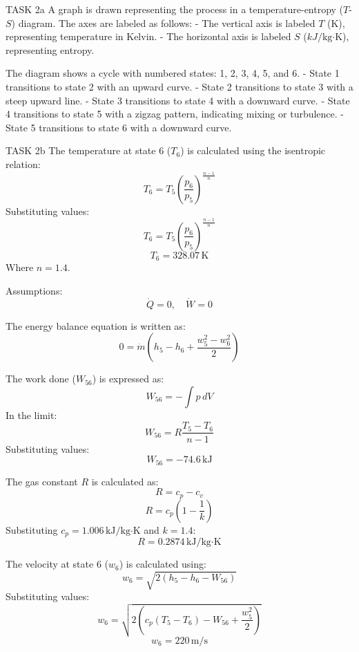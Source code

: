 TASK 2a  
A graph is drawn representing the process in a temperature-entropy (\(T\)-\(S\)) diagram. The axes are labeled as follows:  
- The vertical axis is labeled \(T\) (K), representing temperature in Kelvin.  
- The horizontal axis is labeled \(S\) (\(kJ/\text{kg·K}\)), representing entropy.  

The diagram shows a cycle with numbered states: 1, 2, 3, 4, 5, and 6.  
- State 1 transitions to state 2 with an upward curve.  
- State 2 transitions to state 3 with a steep upward line.  
- State 3 transitions to state 4 with a downward curve.  
- State 4 transitions to state 5 with a zigzag pattern, indicating mixing or turbulence.  
- State 5 transitions to state 6 with a downward curve.  

TASK 2b  
The temperature at state 6 (\(T_6\)) is calculated using the isentropic relation:  
\[
T_6 = T_5 \left( \frac{p_6}{p_5} \right)^{\frac{n-1}{n}}
\]  
Substituting values:  
\[
T_6 = T_5 \left( \frac{p_6}{p_5} \right)^{\frac{n-1}{n}}
\]  
\[
T_6 = 328.07 \, \text{K}
\]  
Where \(n = 1.4\).  

Assumptions:  
\[
\dot{Q} = 0, \quad \dot{W} = 0
\]  

The energy balance equation is written as:  
\[
0 = \dot{m} \left( h_5 - h_6 + \frac{w_5^2 - w_6^2}{2} \right)
\]  

The work done (\(W_{56}\)) is expressed as:  
\[
W_{56} = -\int p \, dV
\]  
In the limit:  
\[
W_{56} = R \frac{T_5 - T_6}{n-1}
\]  
Substituting values:  
\[
W_{56} = -74.6 \, \text{kJ}
\]  

The gas constant \(R\) is calculated as:  
\[
R = c_p - c_v
\]  
\[
R = c_p \left( 1 - \frac{1}{k} \right)
\]  
Substituting \(c_p = 1.006 \, \text{kJ/kg·K}\) and \(k = 1.4\):  
\[
R = 0.2874 \, \text{kJ/kg·K}
\]  

The velocity at state 6 (\(w_6\)) is calculated using:  
\[
w_6 = \sqrt{2 \left( h_5 - h_6 - W_{56} \right)}
\]  
Substituting values:  
\[
w_6 = \sqrt{2 \left( c_p \left( T_5 - T_6 \right) - W_{56} + \frac{w_5^2}{2} \right)}
\]  
\[
w_6 = 220 \, \text{m/s}
\]